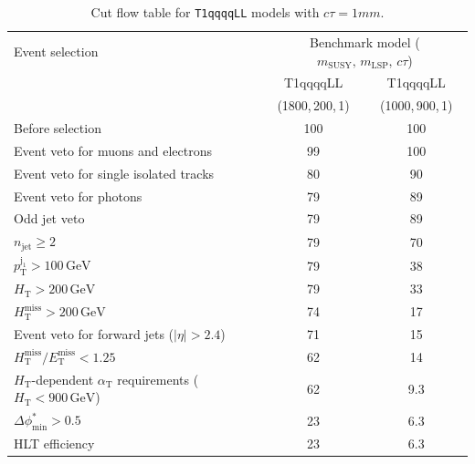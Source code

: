 \begin{table}[!h]
  \caption{Cut flow table for \texttt{T1qqqqLL} models with $c\tau = 1\unit{mm}$.} 
  \label{tab:cut_flow_ctau_1}
{\scriptsize%
\centering
\begin{tabular}{lcc}
  \hline
  Event selection & \multicolumn{2}{c}{Benchmark model ($m_\mathrm{SUSY},\,m_\mathrm{LSP},\,c\tau$)} \\
  \cline{2-3}
   & T1qqqqLL & T1qqqqLL \\
    & (1800,\,200,\,1) & (1000,\,900,\,1) \\
  \hline
  Before selection  & 100\phantom{.1} & 100\phantom{.1} \\
  Event veto for muons and electrons & \phantom{1}99\phantom{.1} & 100\phantom{.1} \\
  Event veto for single isolated tracks & \phantom{1}80\phantom{.1} & \phantom{1}90\phantom{.1} \\
  Event veto for photons & \phantom{1}79\phantom{.1} & \phantom{1}89\phantom{.1} \\
  Odd jet veto & \phantom{1}79\phantom{.1} & \phantom{1}89\phantom{.1} \\
   $n_{\mathrm{jet}} \geq 2$  & \phantom{1}79\phantom{.1} & \phantom{1}70\phantom{.1} \\
   $p_{\mathrm{T}}^{\mathrm{j_1}} > 100\,\mathrm{GeV}$ & \phantom{1}79\phantom{.1} & \phantom{1}38\phantom{.1} \\
   $H_{\mathrm{T}} > 200\,\mathrm{GeV}$  & \phantom{1}79\phantom{.1} & \phantom{1}33\phantom{.1} \\
  $H_{\mathrm{T}}^{\mathrm{miss}} > 200\,\mathrm{GeV}$  & \phantom{1}74\phantom{.1} & \phantom{1}17\phantom{.1} \\
  Event veto for forward jets ($|\eta| > 2.4$) & \phantom{1}71\phantom{.1} & \phantom{1}15\phantom{.1} \\
  $H_{\mathrm{T}}^{\mathrm{miss}} / E_{\mathrm{T}}^{\mathrm{miss}} < 1.25$ & \phantom{1}62\phantom{.1} & \phantom{1}14\phantom{.1} \\
  $H_{\mathrm{T}}$-dependent $\alpha_{\mathrm{T}}$ requirements ($H_{\mathrm{T}} < 900\,\mathrm{GeV}$)  & \phantom{1}62\phantom{.1} & \phantom{10}9.3 \\
  $\Delta\phi^{*}_{\mathrm{min}} > 0.5$  & \phantom{1}23\phantom{.1} & \phantom{10}6.3 \\
  \hline
  HLT efficiency & \phantom{1}23\phantom{.1} & \phantom{10}6.3  \\
  \hline
\end{tabular}
}
\end{table}

